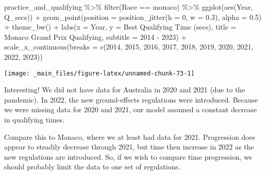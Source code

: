 \documentclass[
]{book}
\newenvironment{Shaded}{\begin{snugshade}}{\end{snugshade}}
\newcommand{\AttributeTok}[1]{\textcolor[rgb]{0.77,0.63,0.00}{#1}}
\newcommand{\DecValTok}[1]{\textcolor[rgb]{0.00,0.00,0.81}{#1}}
\newcommand{\FloatTok}[1]{\textcolor[rgb]{0.00,0.00,0.81}{#1}}
\newcommand{\FunctionTok}[1]{\textcolor[rgb]{0.00,0.00,0.00}{#1}}
\newcommand{\NormalTok}[1]{#1}
\newcommand{\SpecialCharTok}[1]{\textcolor[rgb]{0.00,0.00,0.00}{#1}}
\newcommand{\StringTok}[1]{\textcolor[rgb]{0.31,0.60,0.02}{#1}}
\begin{document}
\begin{Shaded}
\begin{Highlighting}[]
\NormalTok{practice\_and\_qualifying }\SpecialCharTok{\%\textgreater{}\%}
  \FunctionTok{filter}\NormalTok{(Race }\SpecialCharTok{==} \StringTok{\textquotesingle{}monaco\textquotesingle{}}\NormalTok{) }\SpecialCharTok{\%\textgreater{}\%}
  \FunctionTok{ggplot}\NormalTok{(}\FunctionTok{aes}\NormalTok{(Year, Q\_secs)) }\SpecialCharTok{+}
  \FunctionTok{geom\_point}\NormalTok{(}\AttributeTok{position =} \FunctionTok{position\_jitter}\NormalTok{(}\AttributeTok{h =} \DecValTok{0}\NormalTok{, }\AttributeTok{w =} \FloatTok{0.3}\NormalTok{), }\AttributeTok{alpha =} \FloatTok{0.5}\NormalTok{) }\SpecialCharTok{+}
  \FunctionTok{theme\_bw}\NormalTok{() }\SpecialCharTok{+}
  \FunctionTok{labs}\NormalTok{(}\AttributeTok{x =} \StringTok{\textquotesingle{}Year\textquotesingle{}}\NormalTok{,}
       \AttributeTok{y =} \StringTok{\textquotesingle{}Best Qualifying Time (secs)\textquotesingle{}}\NormalTok{,}
       \AttributeTok{title =} \StringTok{\textquotesingle{}Monaco Grand Prix Qualifying\textquotesingle{}}\NormalTok{,}
       \AttributeTok{subtitle =} \StringTok{\textquotesingle{}2014 {-} 2023\textquotesingle{}}\NormalTok{) }\SpecialCharTok{+}
  \FunctionTok{scale\_x\_continuous}\NormalTok{(}\AttributeTok{breaks =} \FunctionTok{c}\NormalTok{(}\DecValTok{2014}\NormalTok{, }\DecValTok{2015}\NormalTok{, }\DecValTok{2016}\NormalTok{, }\DecValTok{2017}\NormalTok{, }\DecValTok{2018}\NormalTok{, }\DecValTok{2019}\NormalTok{, }\DecValTok{2020}\NormalTok{, }\DecValTok{2021}\NormalTok{, }\DecValTok{2022}\NormalTok{, }\DecValTok{2023}\NormalTok{))}
\end{Highlighting}
\end{Shaded}

\begin{center}\texttt{[image: \_main\_files/figure-latex/unnamed-chunk-73-1]} \end{center}

Interesting! We did not have data for Australia in 2020 and 2021 (due to the pandemic). In 2022, the new ground-effects regulations were introduced. Because we were missing data for 2020 and 2021, our model assumed a constant decrease in qualifying times.

Compare this to Monaco, where we at least had data for 2021. Progression does appear to steadily decrease through 2021, but time then increase in 2022 as the new regulations are introduced. So, if we wish to compare time progression, we should probably limit the data to one set of regulations.
\end{document}
